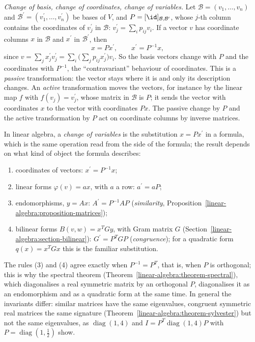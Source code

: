 \begin{remark}\label{linear-algebra:remark-change-of-coordinates}
\emph{Change of basis, change of coordinates, change of variables.} Let $\mathcal{B} = (v_1, \ldots, v_n)$ and $\mathcal{B}^{\prime} = (v_1^{\prime}, \ldots, v_n^{\prime})$ be bases of $V$, and
$P = [\id]_{\mathcal{B}, \mathcal{B}^{\prime}}$, whose $j$-th column contains the coordinates of $v_j^{\prime}$ in $\mathcal{B}$: $v_j^{\prime} = \sum_ip_{ij}v_i$. If a vector $v$ has coordinate
columns $x$ in $\mathcal{B}$ and $x^{\prime}$ in $\mathcal{B}^{\prime}$, then
\[
x = Px^{\prime}, \qquad x^{\prime} = P^{-1}x,
\]
since $v = \sum_jx_j^{\prime}v_j^{\prime} = \sum_i\bigl(\sum_jp_{ij}x_j^{\prime}\bigr)v_i$. So the basis vectors change with $P$ and the coordinates with $P^{-1}$, the ``contravariant'' behaviour of
coordinates. This is a \emph{passive} transformation: the vector stays where it is and only its description changes. An \emph{active} transformation moves the vectors, for instance by the linear
map $f$ with $f(v_j) = v_j^{\prime}$, whose matrix in $\mathcal{B}$ is $P$; it sends the vector with coordinates $x$ to the vector with coordinates $Px$. The passive change by $P$ and the active
transformation by $P$ act on coordinate columns by inverse matrices.

In linear algebra, a \emph{change of variables} is the substitution $x = Px^{\prime}$ in a formula, which is the same operation read from the side of the formula; the result depends on what kind of
object the formula describes:
\begin{enumerate}
\item coordinates of vectors: $x^{\prime} = P^{-1}x$;
\item linear forms $\varphi(v) = ax$, with $a$ a row: $a^{\prime} = aP$;
\item endomorphisms, $y = Ax$: $A^{\prime} = P^{-1}AP$ (\emph{similarity}, Proposition~\ref{linear-algebra:proposition-matrices});
\item bilinear forms $B(v, w) = x^TGy$, with Gram matrix $G$ (Section~\ref{linear-algebra:section-bilinear}): $G^{\prime} = P^TGP$ (\emph{congruence}); for a quadratic form
$q(x) = x^TGx$ this is the familiar substitution.
\end{enumerate}
The rules (3) and (4) agree exactly when $P^{-1} = P^T$, that is, when $P$ is orthogonal; this is why the spectral theorem (Theorem~\ref{linear-algebra:theorem-spectral}), which diagonalises a real
symmetric matrix by an orthogonal $P$, diagonalises it as an endomorphism and as a quadratic form at the same time. In general the invariants differ: similar matrices have the same eigenvalues,
congruent symmetric real matrices the same signature (Theorem~\ref{linear-algebra:theorem-sylvester}) but not the same eigenvalues, as $\operatorname{diag}(1, 4)$ and
$I = P^T\operatorname{diag}(1, 4)P$ with $P = \operatorname{diag}(1, \frac12)$ show.


\end{remark}
